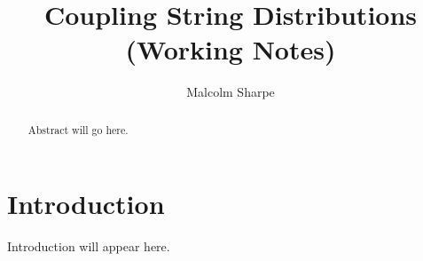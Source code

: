 \documentclass{article}
\title{Coupling String Distributions (Working Notes)}
\author{Malcolm Sharpe}
\date{}
\begin{document}
\maketitle

\begin{abstract}
Abstract will go here.
\end{abstract}

\section{Introduction}
Introduction will appear here.
\end{document}
